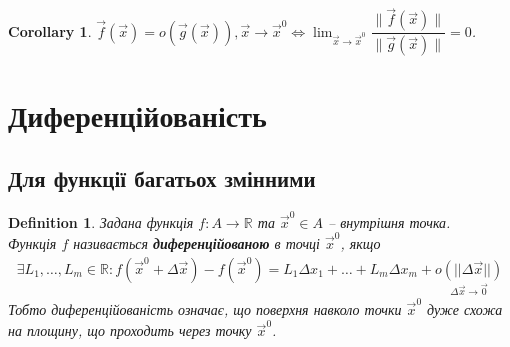 \documentclass[a4paper, 10pt]{article}
\theoremstyle{theoremdd}
\theoremstyle{theoremdd}
\theoremstyle{theoremdd}
\newtheorem{definition}[theorem]{Definition}
\theoremstyle{theoremdd}
\theoremstyle{theoremdd}
\theoremstyle{theoremdd}
\theoremstyle{theoremdd}
\theoremstyle{theoremdd}
\theoremstyle{theoremdd}
\newtheorem{corollary}[theorem]{Corollary}
\newcommand\Norm[1]{\|#1\|}
\begin{document}
\begin{corollary}
$\vec{f}(\vec{x}) = o(\vec{g}(\vec{x})), \vec{x} \to \vec{x}^0 \iff \displaystyle\lim_{\vec{x} \to \vec{x}^0} \dfrac{\Norm{\vec{f}(\vec{x})}}{\Norm{\vec{g}(\vec{x})}} = 0$.
\end{corollary}

\newpage

\section{Диференційованість}
\subsection{Для функції багатьох змінними}
\begin{definition}
Задана функція $f \colon A \to \mathbb{R}$ та $\vec{x}^0 \in A$ -- внутрішня точка.\\
Функція $f$ називається \textbf{диференційованою} в точці $\vec{x}^0$, якщо
\begin{align*}
\exists L_1,\dots, L_m \in \mathbb{R}: f(\vec{x}^0 + \Delta \vec{x}) - f(\vec{x}^0) = L_1 \Delta x_1 + \dots + L_m \Delta x_m + \underset{\Delta \vec{x} \to \vec{0}}{o(||\Delta \vec{x}||)}
\end{align*}
Тобто диференційованість означає, що поверхня навколо точки $\vec{x}^0$ дуже схожа на площину, що проходить через точку $\vec{x}^0$.
\end{definition}
\end{document}
